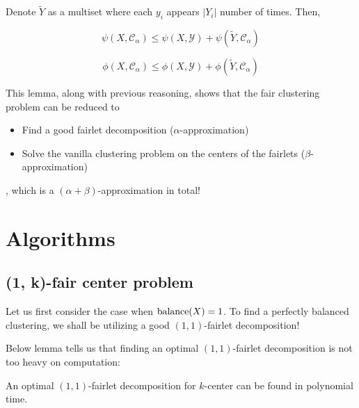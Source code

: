 \begin{lemma}
Denote $\tilde{Y}$ as a multiset where each $y_i$ appears $|Y_i|$ number of times. Then,

$$\psi(X, \mathcal{C}_\alpha) \leq \psi(X, \mathcal{Y}) + \psi(\tilde{Y}, \mathcal{C}_\alpha)$$

$$\phi(X, \mathcal{C}_\alpha) \leq \phi(X, \mathcal{Y}) + \phi(\tilde{Y}, \mathcal{C}_\alpha)$$

\end{lemma}

This lemma, along with previous reasoning, shows that the fair clustering problem can be reduced to
\begin{itemize}
	\item Find a good fairlet decomposition ($\alpha$-approximation)
	\item Solve the vanilla clustering problem on the centers of the fairlets ($\beta$-approximation)
\end{itemize}
, which is a $(\alpha + \beta)$-approximation in total!



\section{Algorithms}

\subsection{(1, k)-fair center problem}

Let us first consider the case when $\operatorname{balance}(X) = 1$. To find a perfectly balanced clustering, we shall be utilizing a good $(1, 1)$-fairlet decomposition!

Below lemma tells us that finding an optimal $(1, 1)$-fairlet decomposition is not too heavy on computation:

\begin{lemma}
An optimal $(1, 1)$-fairlet decomposition for $k$-center can be found in polynomial time.
\end{lemma}

%

